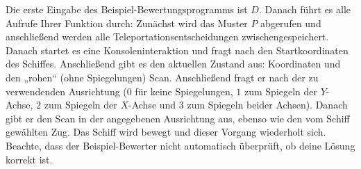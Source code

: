 \documentclass[12pt]{article}
\begin{document}
Die erste Eingabe des Beispiel-Bewertungsprogramms ist $D$. Danach führt es alle Aufrufe Ihrer Funktion durch: Zunächst wird das Muster $P$ abgerufen und anschließend werden alle Teleportationsentscheidungen zwischengespeichert. Danach startet es eine Konsoleninteraktion und fragt nach den Startkoordinaten des Schiffes. Anschließend gibt es den aktuellen Zustand aus: Koordinaten und den „rohen“ (ohne Spiegelungen) Scan. Anschließend fragt er nach der zu verwendenden Ausrichtung ($0$ für keine Spiegelungen, $1$ zum Spiegeln der $Y$-Achse, $2$ zum Spiegeln der $X$-Achse und $3$ zum Spiegeln beider Achsen). Danach gibt er den Scan in der angegebenen Ausrichtung aus, ebenso wie den vom Schiff gewählten Zug. Das Schiff wird bewegt und dieser Vorgang wiederholt sich. Beachte, dass der Beispiel-Bewerter nicht automatisch überprüft, ob deine Lösung korrekt ist.
\end{document}
